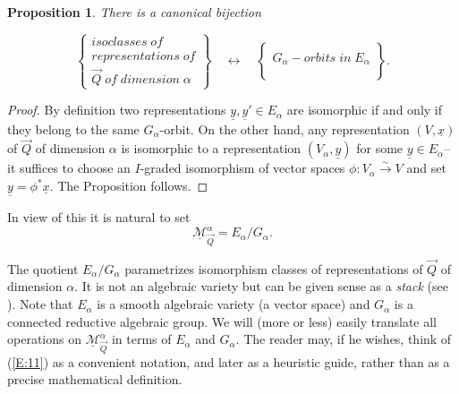 \documentclass[a4paper,10pt]{amsart}
\def\a{\alpha}
\newtheorem{prop}[theo]{Proposition}
\numberwithin{equation}{section}
\begin{document}
\vspace{.1in}

\begin{prop} There is a canonical bijection

$$\begin{Bmatrix} isoclasses\;of\\ representations\;of\\ \vec{Q}\;of\;dimension\;\alpha \end{Bmatrix}\quad
\longleftrightarrow \quad\begin{Bmatrix} \\G_{\alpha}-orbits\;in\;E_{\alpha}\\ \\ \end{Bmatrix}.
$$
\end{prop}

\begin{proof} By definition two representations $\underline{y}, \underline{y}' \in E_{\alpha}$ are isomorphic if and only if they belong to the same $G_{\alpha}$-orbit. On the other hand,  any representation $(V,\underline{x})$ of $\vec{Q}$ of dimension $\alpha$ is isomorphic to a representation $(V_{\alpha},\underline{y})$ for some $\underline{y} \in E_{\alpha}$--it suffices to choose an $I$-graded isomorphism of vector spaces $\phi: V_{\alpha} \stackrel{\sim}{\to} V$ and set $\underline{y}=\phi^* \underline{x}$. The Proposition follows.\end{proof}

\vspace{.1in}

In view of this it is natural to set
\begin{equation}\label{E:11}
\underline{\mathcal{M}}^{\alpha}_{\vec{Q}}=E_{\alpha}/G_{\alpha}.
\end{equation}

The quotient $E_{\alpha}/G_{\alpha}$ parametrizes isomorphism classes of representations of $\vec{Q}$ of dimension $\a$. It is not an algebraic variety but can be given sense as a \textit{stack} (see \cite{LMB}).  Note that $E_{\alpha}$ is a smooth algebraic variety (a vector space) and $G_{\alpha}$ is a connected reductive algebraic group. We will (more or less) easily translate all operations on $\underline{\mathcal{M}}^{\alpha}_{\vec{Q}}$ in terms of $E_{\alpha}$ and $G_{\alpha}$. The reader may, if he wishes, think of (\ref{E:11}) as a convenient notation, and later as a heuristic guide, rather than as a precise mathematical definition.
\end{document}
